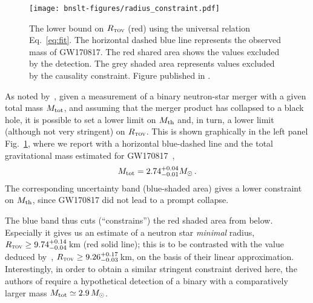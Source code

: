 \begin{figure}
	\texttt{[image: bnslt-figures/radius\_constraint.pdf]}
	\caption[
	BNS Lifetimes: Radius constraints, 
	]{The lower bound on $R_{\textsc{tov}}$ (red) using the universal relation
		Eq.~\protect\eqref{eq:fit}. The horizontal dashed blue line
		represents the observed mass of GW170817. The red shared area shows the
		values excluded by the detection. The grey shaded area represents
		values excluded by the causality constraint. Figure published in
		\cite{Koeppel2019}.
	}
	\label{fig:radius-constraint}
\end{figure}

As noted by~\cite{Bauswein2017b}, given a measurement
of a binary neutron-star merger with a given total mass $M_{\rm tot}$,
and assuming that the merger product has collapsed to a black hole, it is
possible to set a lower limit on $M_{\rm th}$ and, in turn, a lower limit
(although not very stringent) on $R_{\textsc{tov}}$. This is shown
graphically in the left panel Fig.~\ref{fig:radius-constraint}, where we
report with a horizontal blue-dashed line and the total gravitational
mass estimated for GW170817~\cite{Abbott2017},
\begin{equation}\label{eq:radius-constraint-outcome}
M_\text{tot} = 2.74 ^{+0.04}_{-0.01} M_{\odot}
\,.
\end{equation}
The corresponding uncertainty band (blue-shaded area) gives a lower
constraint on $M_{\rm th}$, since GW170817 did not lead to a prompt
collapse.

The blue band thus cuts (``constrains'') the red shaded area from below.
Especially it gives us an estimate of a neutron star \emph{minimal} radius,
$R_{\textsc{tov}} \ge 9.74^{+0.14}_{-0.04}\,$km (red solid line);
this is to be contrasted with the value deduced by~\cite{Bauswein2017b},
\ie $R_{\textsc{tov}} \ge 9.26^{+0.17}_{-0.03}\,$km, on the basis of
their linear approximation. Interestingly, in order to obtain a similar
stringent constraint derived here, the authors
of \cite{Bauswein2017b} require a
hypothetical detection of a binary with a comparatively larger mass
$M_{\rm tot} \simeq 2.9\,M_{\odot}$.

